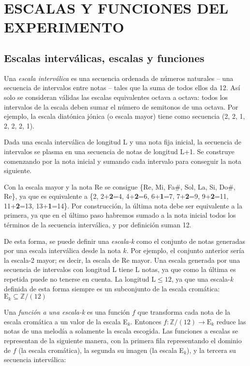 \section{ESCALAS Y FUNCIONES DEL EXPERIMENTO}\label{ch:escalas}	
	\subsection{Escalas interválicas, escalas y funciones}
	
		Una \textit{escala interválica} es una secuencia ordenada de números naturales -- una secuencia de intervalos entre notas -- tales que la suma de todos ellos da 12. Así solo se consideran válidas las escalas equivalentes octava a octava: todos los intervalos de la escala deben sumar el número de semitonos de una octava. Por ejemplo, la escala diatónica jónica (o escala mayor) tiene como secuencia (2, 2, 1, 2, 2, 2, 1).
		
		Dada una escala interválica de longitud L y una nota fija inicial, la secuencia de intervalos se plasma en una secuencia de notas de longitud L+1. Se construye comenzando por la nota inicial y sumando cada intervalo para conseguir la nota siguiente. 
		
		Con la escala mayor y la nota Re se consigue \{Re, Mi, Fa$\#$, Sol, La, Si, Do$\#$, Re\}, ya que es equivalente a \{2, 2+\textbf{2}=4, 4+\textbf{2}=6, 6+\textbf{1}=7, 7+\textbf{2}=9, 9+\textbf{2}=11, 11+\textbf{2}=13, 13+\textbf{1}=14\}. Por construcción, la última nota debe ser equivalente a la primera, ya que en el último paso habremos sumado a la nota inicial todos los términos de la secuencia interválica, y por definición suman 12.
		
		De esta forma, se puede definir una \textit{escala-k} como el conjunto de notas generadas por una escala interválica desde la nota $k$. Por ejemplo, el conjunto anterior sería la escala-2 mayor; es decir, la escala de Re mayor. Una escala generada por una secuencia de intervalos con longitud L tiene L notas, ya que como la última es repetida puede no tenerse en cuenta. La longitud $\text{L}\leq 12$, ya que una escala-\textit{k} definida de esta forma siempre es un subconjunto de la escala cromática: $\text{E}_k\subseteq\mathbb{Z}/(12)$
		
		Una \textit{función a una escala-k} es una función $f$ que transforma cada nota de la escala cromática a un valor de la escala E$_k$. Entonces $f : \mathbb{Z}/(12) \rightarrow \text{E}_k$ reduce las notas de una melodía a solamente la escala escogida. Las funciones a escalas se representan de la siguiente manera, con la primera fila representando el dominio de $f$ (la escala cromática), la segunda su imagen (la escala E$_k$), y la tercera su secuencia interválica:
		
